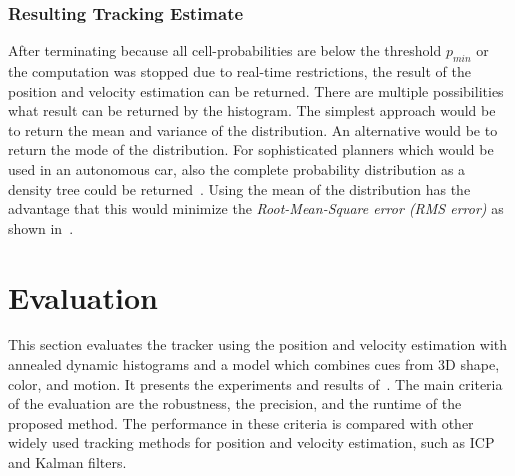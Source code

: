 \documentclass[twoside,a4paper,article]{combine}
\begin{document}
\subsubsection{Resulting Tracking Estimate}
\label{sub:adh-resulting}
After terminating because all cell-probabilities are below the
threshold $p_{min}$ or the computation was stopped due to real-time
restrictions, the result of the position and velocity estimation can
be returned. There are multiple possibilities what result can be
returned by the histogram. The simplest approach would be to return
the mean and variance of the distribution. An alternative would be to
return the mode of the distribution. For sophisticated planners which
would be used in an autonomous car, also the complete probability
distribution as a density tree could be returned~\cite{density-tree}.
Using the mean of the distribution has the advantage that this would
minimize the \textit{Root-Mean-Square error (RMS error)} as shown
in~\cite{paper}.

\section{Evaluation}
\label{sec:evaluation}
This section evaluates the tracker using the position and velocity
estimation with annealed dynamic histograms and a model which combines
cues from 3D shape, color, and motion. It presents the experiments and
results of~\cite{paper}. The main criteria of the evaluation are the
robustness, the precision, and the runtime of the proposed
method. The performance in these criteria is compared with other
widely used tracking methods for position and velocity estimation,
such as ICP and Kalman filters.
\end{document}
